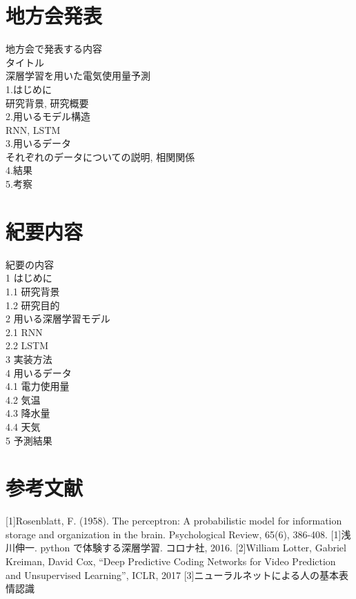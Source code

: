 \section{地方会発表}
地方会で発表する内容\\
タイトル\\
深層学習を用いた電気使用量予測\\
1.はじめに\\
研究背景, 研究概要\\
2.用いるモデル構造\\
RNN, LSTM\\
3.用いるデータ\\
それぞれのデータについての説明, 相関関係\\
4.結果\\
5.考察\\

\section{紀要内容}
紀要の内容\\
1 はじめに\\
1.1 研究背景\\
1.2 研究目的\\
2 用いる深層学習モデル\\
2.1 RNN\\
2.2 LSTM\\
3 実装方法\\
4 用いるデータ\\
4.1 電力使用量\\
4.2 気温\\
4.3 降水量\\
4.4 天気\\
5 予測結果\\

\section{参考文献}
[1]Rosenblatt, F. (1958). The perceptron: A probabilistic model for information storage and organization in the brain. Psychological Review, 65(6), 386-408.
[1]浅川伸一. python で体験する深層学習. コロナ社, 2016.
[2]William Lotter, Gabriel Kreiman, David Cox, “Deep Predictive Coding Networks for Video Prediction and Unsupervised Learning”, ICLR, 2017
[3]ニューラルネットによる人の基本表情認識 



